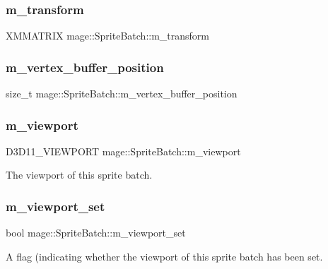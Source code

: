 \hypertarget{classmage_1_1_sprite_batch_ad8a12f1f6c8289548346d469c9436c58}{}\label{classmage_1_1_sprite_batch_ad8a12f1f6c8289548346d469c9436c58} 
\subsubsection{\texorpdfstring{m\+\_\+transform}{m\_transform}}
{\footnotesize\ttfamily X\+M\+M\+A\+T\+R\+IX mage\+::\+Sprite\+Batch\+::m\+\_\+transform\hspace{0.3cm}{\ttfamily [private]}}

\hypertarget{classmage_1_1_sprite_batch_afd6af84ab6728bfa907e6b8153357585}{}\label{classmage_1_1_sprite_batch_afd6af84ab6728bfa907e6b8153357585} 
\subsubsection{\texorpdfstring{m\+\_\+vertex\+\_\+buffer\+\_\+position}{m\_vertex\_buffer\_position}}
{\footnotesize\ttfamily size\+\_\+t mage\+::\+Sprite\+Batch\+::m\+\_\+vertex\+\_\+buffer\+\_\+position\hspace{0.3cm}{\ttfamily [private]}}

\hypertarget{classmage_1_1_sprite_batch_a3029ab1ee01ccfc69fef88eb78d5bfc0}{}\label{classmage_1_1_sprite_batch_a3029ab1ee01ccfc69fef88eb78d5bfc0} 
\subsubsection{\texorpdfstring{m\+\_\+viewport}{m\_viewport}}
{\footnotesize\ttfamily D3\+D11\+\_\+\+V\+I\+E\+W\+P\+O\+RT mage\+::\+Sprite\+Batch\+::m\+\_\+viewport\hspace{0.3cm}{\ttfamily [private]}}

The viewport of this sprite batch. \hypertarget{classmage_1_1_sprite_batch_aefa38f98b30d09e3521ccdcc12bac6d0}{}\label{classmage_1_1_sprite_batch_aefa38f98b30d09e3521ccdcc12bac6d0} 
\subsubsection{\texorpdfstring{m\+\_\+viewport\+\_\+set}{m\_viewport\_set}}
{\footnotesize\ttfamily bool mage\+::\+Sprite\+Batch\+::m\+\_\+viewport\+\_\+set\hspace{0.3cm}{\ttfamily [private]}}

A flag (indicating whether the viewport of this sprite batch has been set. 